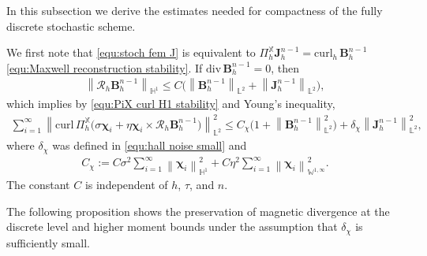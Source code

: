\documentclass[11pt, reqno]{amsart}
\theoremstyle{definition}
\numberwithin{equation}{section}
\newcommand{\curl}{\mathrm{curl}\,}
\newcommand{\divg}{\mathrm{div}\,}
\newcommand{\bff}{\boldsymbol}
\newcommand{\bb}{\mathbb}
\newcommand{\norm}[2]{\left\|{#1}\right\|_{#2}}
\newcommand{\curlh}{\mathrm{curl}_h\,}
\begin{document}
In this subsection we derive the estimates needed for compactness of the fully discrete stochastic scheme.

We first note that \eqref{equ:stoch fem J} is equivalent to $\Pi_h^{\bb{X}} \bff{J}_h^{n-1}=\curlh\bff{B}_h^{n-1}$ \eqref{equ:Maxwell reconstruction stability}. If $\divg\bff{B}_h^{n-1}=0$, then
\begin{align}\label{equ:stoch reconstruction B bound}
	\norm{\mathcal{R}_h\bff{B}_h^{n-1}}{\bb{H}^1}
	\leq
	C\bigl(\norm{\bff{B}_h^{n-1}}{\bb{L}^2}+\norm{\bff{J}_h^{n-1}}{\bb{L}^2}\bigr),
\end{align}
which implies by \eqref{equ:PiX curl H1 stability} and Young's inequality,
\begin{align}\label{equ:hall current coeff bound final}
	\sum_{i=1}^{\infty}\norm{\curl \Pi_h^{\bb{X}}\bigl(\sigma\bff{\chi}_i+\eta\bff{\chi}_i\times\mathcal{R}_h\bff{B}_h^{n-1}\bigr)}{\bb{L}^2}^2
	\leq
	C_\chi\bigl(1+\norm{\bff{B}_h^{n-1}}{\bb{L}^2}^2\bigr)+\delta_\chi\norm{\bff{J}_h^{n-1}}{\bb{L}^2}^2,
\end{align}
where $\delta_\chi$ was defined in \eqref{equ:hall noise small} and
\begin{align*}
	C_\chi:=C\sigma^2\sum_{i=1}^{\infty}\norm{\bff{\chi}_i}{\bb{H}^1}^2+C\eta^2\sum_{i=1}^{\infty}\norm{\bff{\chi}_i}{\bb{W}^{1,\infty}}^2.
\end{align*}
The constant $C$ is independent of $h$, $\tau$, and $n$.


The following proposition shows the preservation of magnetic divergence at the discrete level and higher moment bounds under the assumption that $\delta_\chi$ is sufficiently small.
\end{document}
